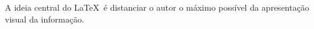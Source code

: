 A ideia central do \LaTeX\ é distanciar o autor
o máximo possível da apresentação visual da informação.
